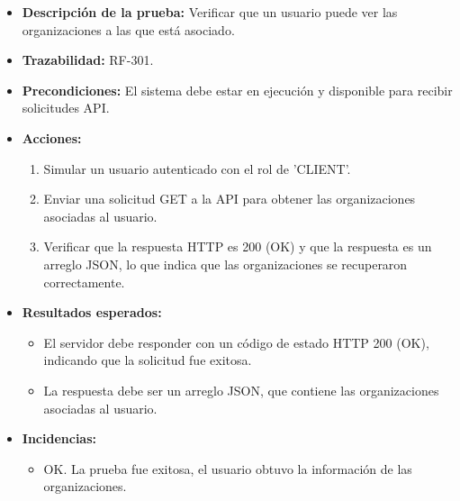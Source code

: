 \begin{itemize}
    \item \textbf{Descripción de la prueba:} Verificar que un usuario puede ver las organizaciones a las que está asociado.
    \item \textbf{Trazabilidad:} RF-301.
    \item \textbf{Precondiciones:} El sistema debe estar en ejecución y disponible para recibir solicitudes API.
    \item \textbf{Acciones:}
    \begin{enumerate}
        \item Simular un usuario autenticado con el rol de 'CLIENT'.
        \item Enviar una solicitud GET a la API para obtener las organizaciones asociadas al usuario.
        \item Verificar que la respuesta HTTP es 200 (OK) y que la respuesta es un arreglo JSON, lo que indica que las organizaciones se recuperaron correctamente.
    \end{enumerate}
    \item \textbf{Resultados esperados:}
    \begin{itemize}
        \item El servidor debe responder con un código de estado HTTP 200 (OK), indicando que la solicitud fue exitosa.
        \item La respuesta debe ser un arreglo JSON, que contiene las organizaciones asociadas al usuario.
    \end{itemize}
    \item \textbf{Incidencias:}
    \begin{itemize}
        \item OK. La prueba fue exitosa, el usuario obtuvo la información de las organizaciones.
    \end{itemize}
\end{itemize}

